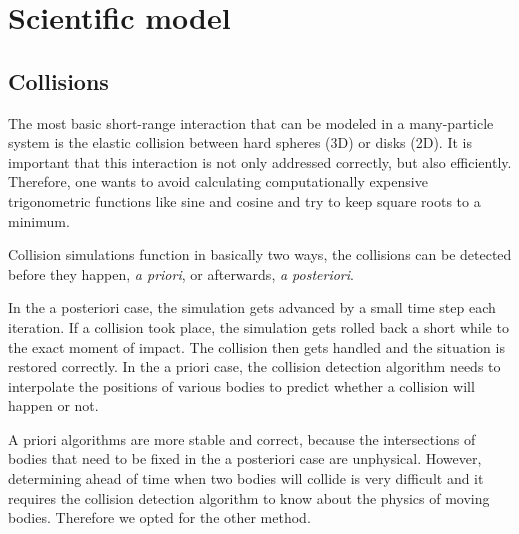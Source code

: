 \section{Scientific model}
\subsection{Collisions}

The most basic short-range interaction that can be modeled in a many-particle 
system is the elastic collision between hard spheres (3D) or disks (2D). It is 
important that this interaction is not only addressed correctly, but also 
efficiently. Therefore, one wants to avoid calculating computationally 
expensive trigonometric functions like sine and cosine and try to keep square 
roots to a minimum.

Collision simulations function in basically two ways, the collisions can be 
detected before they happen, \emph{a priori}, or afterwards, \emph{a 
posteriori}.

In the a posteriori case, the simulation gets advanced by a small time step 
each iteration. If a collision took place, the simulation gets rolled back a 
short while to the exact moment of impact. The collision then gets handled and 
the situation is restored correctly. In the a priori case, the collision 
detection algorithm needs to interpolate the positions of various bodies to 
predict whether a collision will happen or not.

A priori algorithms are more stable and correct, because the intersections of 
bodies that need to be fixed in the a posteriori case are unphysical. However, 
determining ahead of time when two bodies will collide is very difficult and it 
requires the collision detection algorithm to know about the physics of 
moving bodies. Therefore we opted for the other method.

